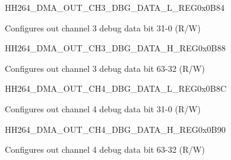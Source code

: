     
    \begin{register}{H}{H264\_DMA\_OUT\_CH3\_DBG\_DATA\_L\_REG}{0x0B84}\label{regdesc:H264DMAOUTCH3DBGDATALREG}
    \regnewline%
    \begin{regdesc}\begin{reglist}
    \label{fielddesc:H264OUTCH3DBGDATAL}\item [H264\_OUT\_CH3\_DBG\_DATA\_L] Configures out channel 3 debug data bit 31-0 (R/W)
    \end{reglist}\end{regdesc}
    \end{register}
    
    
    \begin{register}{H}{H264\_DMA\_OUT\_CH3\_DBG\_DATA\_H\_REG}{0x0B88}\label{regdesc:H264DMAOUTCH3DBGDATAHREG}
    \regnewline%
    \begin{regdesc}\begin{reglist}
    \label{fielddesc:H264OUTCH3DBGDATAH}\item [H264\_OUT\_CH3\_DBG\_DATA\_H] Configures out channel 3 debug data bit 63-32 (R/W)
    \end{reglist}\end{regdesc}
    \end{register}
    
    
    \begin{register}{H}{H264\_DMA\_OUT\_CH4\_DBG\_DATA\_L\_REG}{0x0B8C}\label{regdesc:H264DMAOUTCH4DBGDATALREG}
    \regnewline%
    \begin{regdesc}\begin{reglist}
    \label{fielddesc:H264OUTCH4DBGDATAL}\item [H264\_OUT\_CH4\_DBG\_DATA\_L] Configures out channel 4 debug data bit 31-0 (R/W)
    \end{reglist}\end{regdesc}
    \end{register}
    
    
    \begin{register}{H}{H264\_DMA\_OUT\_CH4\_DBG\_DATA\_H\_REG}{0x0B90}\label{regdesc:H264DMAOUTCH4DBGDATAHREG}
    \regnewline%
    \begin{regdesc}\begin{reglist}
    \label{fielddesc:H264OUTCH4DBGDATAH}\item [H264\_OUT\_CH4\_DBG\_DATA\_H] Configures out channel 4 debug data bit 63-32 (R/W)
    \end{reglist}\end{regdesc}
    \end{register}
    
